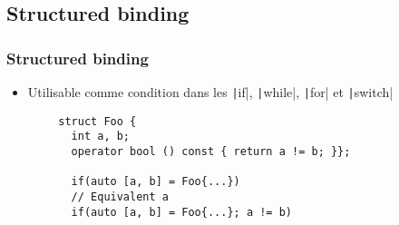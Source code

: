 \documentclass[C++.tex]{subfiles}
\begin{document}
\subsection*{Structured binding}
\begin{frame}[fragile]
	\frametitle{Structured binding}
	\begin{itemize}
		\item Utilisable comme condition dans les \texttt|if|, \texttt|while|, \texttt|for| et \texttt|switch|
	\end{itemize}

	\begin{verbatim}
		struct Foo {
		  int a, b;
		  operator bool () const { return a != b; }};

		  if(auto [a, b] = Foo{...})
		  // Equivalent a
		  if(auto [a, b] = Foo{...}; a != b)
	\end{verbatim}


\end{frame}
\end{document}
